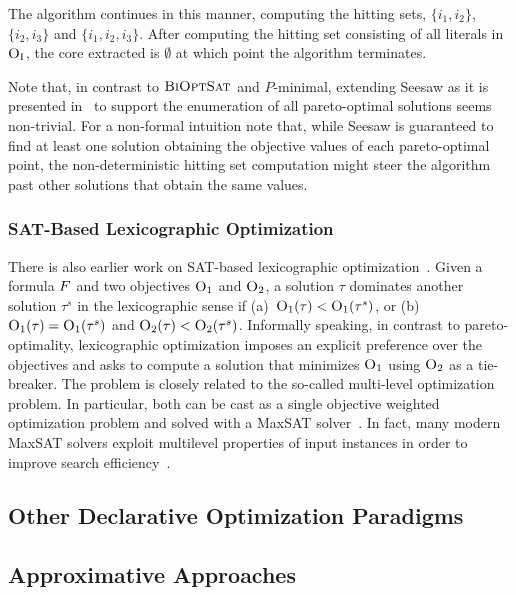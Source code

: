 \begin{example}
  The algorithm continues in this manner, computing the hitting sets, $\{i_1, i_2\}$, $\{i_2, i_3\}$ and $\{i_1, i_2, i_3\}$. 
  After computing the hitting set consisting of all literals in $\textsc{O}_{\text{I}}$, the core extracted is $\emptyset$ at which point the algorithm terminates. 
\end{example}

Note that, in contrast to $\textsc{BiOptSat}$ and $P$-minimal, extending Seesaw as it is presented in~\textcite{DBLP:conf/cp/JanotaMSM21} to support the enumeration of all pareto-optimal solutions seems non-trivial.
For a non-formal intuition note that, while Seesaw is guaranteed to find at least one solution obtaining the objective values of each pareto-optimal point, the non-deterministic hitting set computation might steer the algorithm past other solutions that obtain the same values.

\subsubsection{SAT-Based Lexicographic Optimization\label{sec:lex-opt}}

There is also earlier work on SAT-based lexicographic optimization~\autocite{DBLP:journals/ors/EhrgottG00,DBLP:conf/ijcai/ArgelichLS09,DBLP:journals/amai/Marques-SilvaAGL11}. 
Given a formula $F$ and two objectives $\textsc{O}_1$ and $\textsc{O}_2$, a solution $\tau$ dominates another solution $\tau^s$ in the lexicographic sense if (a)~$\textsc{O}_1(\tau) < \textsc{O}_1(\tau^s)$, or (b)~$\textsc{O}_1(\tau) = \textsc{O}_1(\tau^s)$ and $\textsc{O}_2(\tau) < \textsc{O}_2(\tau^s)$.
Informally speaking, in contrast to pareto-optimality, lexicographic optimization imposes an explicit preference over the objectives and asks to compute a solution that minimizes $\textsc{O}_1$ using $\textsc{O}_2$ as a tie-breaker.
The problem is closely related to the so-called multi-level optimization problem.
In particular, both can be cast as a single objective weighted optimization problem and solved with a MaxSAT solver~\autocite{DBLP:conf/ijcai/ArgelichLS09,DBLP:journals/amai/Marques-SilvaAGL11}.
In fact, many modern MaxSAT solvers exploit  multilevel properties of input instances in order to improve search efficiency~\autocite{DBLP:conf/vmcai/PaxianRB21,DBLP:conf/cp/AnsoteguiBGL12}.

\subsection{Other Declarative Optimization Paradigms\label{sec:other-approaches}}

\subsection{Approximative Approaches\label{sec:approximative}}
